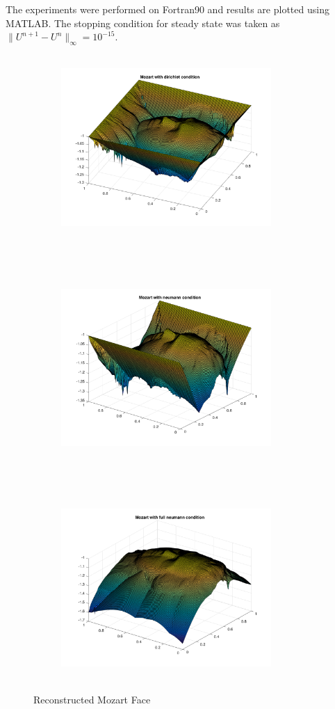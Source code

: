 \documentclass[11pt]{report}
\begin{document}
	\noindent
	The experiments were performed on Fortran90 and results are plotted using MATLAB. The stopping condition for steady state was taken as  $\lVert U^{n+1}-U^{n}\rVert_{\infty} = 10^{-15}$.
	\begin{figure}[h!]
		\begin{subfigure}{0.5\textwidth}
			\includegraphics[width = 8cm, height = 7cm]{moz_dirich.png}
		\end{subfigure}
		~
		\begin{subfigure}{0.5\textwidth}
			\includegraphics[width = 8cm, height = 7cm]{moz_neu_part.png}
		\end{subfigure}
		~
		\begin{subfigure}{0.5\textwidth}
			\includegraphics[width = 8cm, height = 7cm]{moz_fneu.png}
		\end{subfigure}
		\caption{Reconstructed Mozart Face}
		\label{fig:3}
	\end{figure}
	
\end{document}
